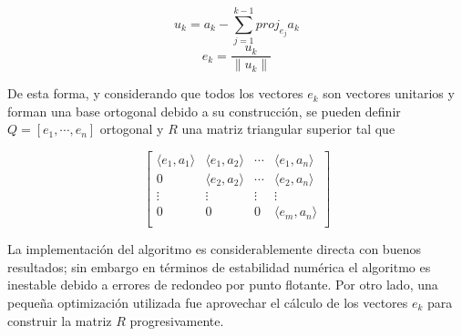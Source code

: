 \documentclass[journal, monochrome]{IEEEtran}
\begin{document}
\begin{equation}
u_{k} = a_{k} - \sum_{j=1}^{k-1} proj_{e_{j}}a_{k}
\end{equation}
\begin{equation}
e_{k} = \frac{u_k}{\parallel u_k \parallel}
\end{equation}

De esta forma, y considerando que todos los vectores $e_k$ son vectores unitarios y forman una base ortogonal debido a su construcción, se pueden definir $ Q = [ e_1, \cdots , e_n ] $ ortogonal y $R$ una matriz triangular superior tal que

\begin{equation}
\left[
\begin{array}{cccc}
\langle e_1, a_1 \rangle & \langle e_1, a_2 \rangle & \cdots & \langle e_1, a_n \rangle \\
0 & \langle e_2, a_2 \rangle & \cdots & \langle e_2, a_n \rangle \\
\vdots & \vdots & \vdots & \vdots \\
0 & 0 & 0 & \langle e_m, a_n \rangle \\
\end{array}
\right]
\end{equation}

La implementación del algoritmo es considerablemente directa con buenos resultados; sin embargo en términos de estabilidad numérica el algoritmo es inestable debido a errores de redondeo por punto flotante. 
Por otro lado, una pequeña optimización utilizada fue aprovechar el cálculo de los vectores $e_k$ para construir la matriz $R$ progresivamente.

\vspace{0.5cm}
\end{document}
